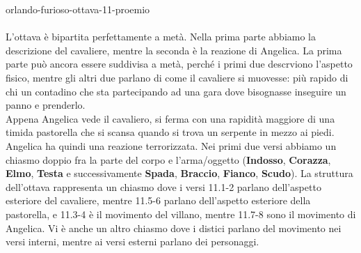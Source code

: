 \documentclass[preview]{standalone}
\begin{document}
\begin{snippet}{orlando-furioso-ottava-11-proemio}
    \\\\
    L'ottava è bipartita perfettamente a metà.
    Nella prima parte abbiamo la descrizione del cavaliere,
    mentre la seconda è la reazione di Angelica.
    La prima parte può ancora essere suddivisa a metà, perché i primi
    due descrviono l'aspetto fisico, mentre gli altri due parlano di 
    come il cavaliere si muovesse: più rapido di
    chi un contadino che sta partecipando ad una gara
    dove bisognasse inseguire un panno e prenderlo.
    \\ Appena Angelica vede il cavaliero, si ferma con una rapidità
    maggiore di una timida pastorella che si scansa quando si trova un
    serpente in mezzo ai piedi.
    Angelica ha quindi una reazione terrorizzata.
    Nei primi due versi abbiamo un chiasmo doppio fra la parte del corpo
    e l'arma/oggetto (\textbf{Indosso}, \textbf{Corazza}, \textbf{Elmo}, \textbf{Testa}
    e successivamente \textbf{Spada}, \textbf{Braccio}, \textbf{Fianco}, \textbf{Scudo}).
    La struttura dell'ottava rappresenta un chiasmo dove i versi 11.1-2 parlano
    dell'aspetto esteriore del cavaliere, mentre 11.5-6 parlano dell'aspetto esteriore della pastorella,
    e 11.3-4 è il movimento del villano, mentre 11.7-8 sono il movimento di Angelica.
    Vi è anche un altro chiasmo dove i distici parlano del movimento nei versi interni, mentre ai versi esterni
    parlano dei personaggi.
\end{snippet}
\end{document}
